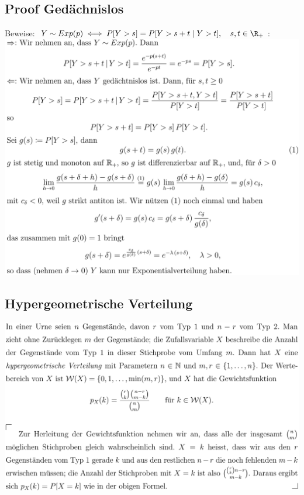 \subsection{Proof Gedächnislos}
Beweise: $Y \sim Exp(p) \iff P[Y > s] = P[Y > s + t \mid Y > t], \quad s,t \in \R_+$:
\\ \includegraphics[width=\linewidth]{./Figures/proof_Gedaechnislos.png}

\subsection{Hypergeometrische Verteilung}
\includegraphics[width=\linewidth]{./Figures/Hypergeometrische_Verteilung.png}

